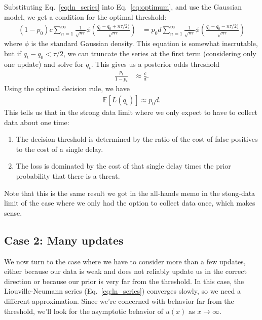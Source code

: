 \documentclass[12pt, letterpaper]{article}
\begin{document}
Substituting Eq.~\ref{eq:ln_series} into Eq.~\ref{eq:optimum}, and use the Gaussian model, we get a condition for the optimal threshold:
\begin{align}
    (1 - p_0) c \sum_{n=1}^{\infty} \frac{1}{\sqrt{n\tau}} \phi\left(\frac{q_t - q_0 + n \tau / 2)}{\sqrt{n\tau}} \right) & =
    p_0 d \sum_{n=1}^{\infty} \frac{1}{\sqrt{n\tau}} \phi\left(\frac{q_t - q_0 - n \tau / 2)}{\sqrt{n\tau}} \right)
\end{align}
where $\phi$ is the standard Gaussian density.
This equation is somewhat inscrutable, but if $q_t - q_0 < \tau / 2$, we can truncate the series at the first term (considering only one update) and solve for $q_t$.
This gives us a posterior odds threshold
\begin{align}
    \frac{p_t}{1-p_t} & \approx \frac{c}{d}.
\end{align}
Using the optimal decision rule, we have
\begin{align}
    \mathbb{E}[L(q_t)] \approx p_0 d.
\end{align}
This tells us that in the strong data limit where we only expect to have to collect data about one time:
\begin{enumerate}
    \item The decision threshold is determined by the ratio of the cost of false positives to the cost of a single delay.
    \item The loss is dominated by the cost of that single delay times the prior probability that there is a threat.
\end{enumerate}
Note that this is the same result we got in the all-hands memo in the stong-data limit of the case where we only had the option to collect data once, which makes sense.

\subsection{Case 2: Many updates}

We now turn to the case where we have to consider more than a few updates, either because our data is weak and does not reliably update us in the correct direction or because our prior is very far from the threshold.
In this case, the Liouville-Neumann series (Eq.~\ref{eq:ln_series}) converges slowly, so we need a different approximation.
Since we're concerned with behavior far from the threshold, we'll look for the asymptotic behavior of $u(x)$ as $x \to \infty$.
\end{document}

